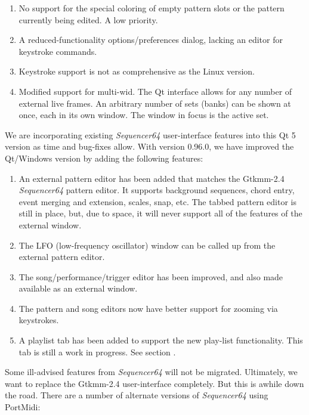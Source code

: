    \begin{enumerate}
      \item No support for the special coloring of empty pattern slots
         or the pattern currently being edited. A low priority.
      \item A reduced-functionality options/preferences dialog, lacking an
         editor for keystroke commands.
      \item Keystroke support is not as comprehensive as the Linux version.
      \item Modified support for multi-wid.  The Qt interface allows
         for any number of external live frames.
         An arbitrary number of sets (banks) can be shown at once,
         each in its own window.  The window in focus is the active set.
   \end{enumerate}

   We are incorporating existing \textsl{Sequencer64} user-interface
   features into this Qt 5 version as time and bug-fixes allow.
   With version 0.96.0, we have improved the Qt/Windows version by adding the
   following features:

   \begin{enumerate}
      \item An external pattern editor has been added that matches
         the Gtkmm-2.4 \textsl{Sequencer64} pattern editor.  It supports
         background sequences, chord entry, event merging and extension,
         scales, snap, etc.  The tabbed pattern editor is still in place, but,
         due to space, it will never support all of the features of the
         external window.
      \item The LFO (low-frequency oscillator) window can be
         called up from the external pattern editor.
      \item The song/performance/trigger editor has been improved, and also
         made available as an external window.
      \item The pattern and song editors now have better support for zooming
         via keystrokes.
      \item A playlist tab has been added to support the new play-list
         functionality.  This tab is still a work in progress.
         See section .
   \end{enumerate}

   Some ill-advised features from \textsl{Sequencer64} will not be migrated.
   Ultimately, we want to replace the Gtkmm-2.4 user-interface completely.
   But this is awhile down the road.
   There are a number of alternate versions of \textsl{Sequencer64} using
   PortMidi:

